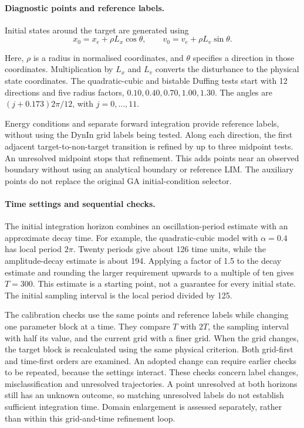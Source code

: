 \begin{revision}
\paragraph{Diagnostic points and reference labels.}
Initial states around the target are generated using
\[
 x_0=x_e+\rho L_x\cos\theta,\qquad
 v_0=v_e+\rho L_v\sin\theta.
\]
\end{revision}
Here, $\rho$ is a radius in normalised coordinates, and $\theta$ specifies a direction in those coordinates. Multiplication by $L_x$ and $L_v$ converts the disturbance to the physical state coordinates. The quadratic-cubic and bistable Duffing tests start with 12 directions and five radius factors, $0.10,0.40,0.70,1.00,1.30$. The angles are $(j+0.173)2\pi/12$, with $j=0,\ldots,11$.

Energy conditions and separate forward integration provide reference labels, without using the DynIn grid labels being tested. Along each direction, the first adjacent target-to-non-target transition is refined by up to three midpoint tests. An unresolved midpoint stops that refinement. This adds points near an observed boundary without using an analytical boundary or reference LIM. The auxiliary points do not replace the original GA initial-condition selector.

\paragraph{Time settings and sequential checks.}
The initial integration horizon combines an oscillation-period estimate with an approximate decay time. For example, the quadratic-cubic model with $\alpha=0.4$ has local period $2\pi$. Twenty periods give about 126 time units, while the amplitude-decay estimate is about 194. Applying a factor of 1.5 to the decay estimate and rounding the larger requirement upwards to a multiple of ten gives $T=300$. This estimate is a starting point, not a guarantee for every initial state. The initial sampling interval is the local period divided by 125.

The calibration checks use the same points and reference labels while changing one parameter block at a time. They compare $T$ with $2T$, the sampling interval with half its value, and the current grid with a finer grid. When the grid changes, the target block is recalculated using the same physical criterion. Both grid-first and time-first orders are examined. An adopted change can require earlier checks to be repeated, because the settings interact. These checks concern label changes, misclassification and unresolved trajectories. A point unresolved at both horizons still has an unknown outcome, so matching unresolved labels do not establish sufficient integration time. Domain enlargement is assessed separately, rather than within this grid-and-time refinement loop.

